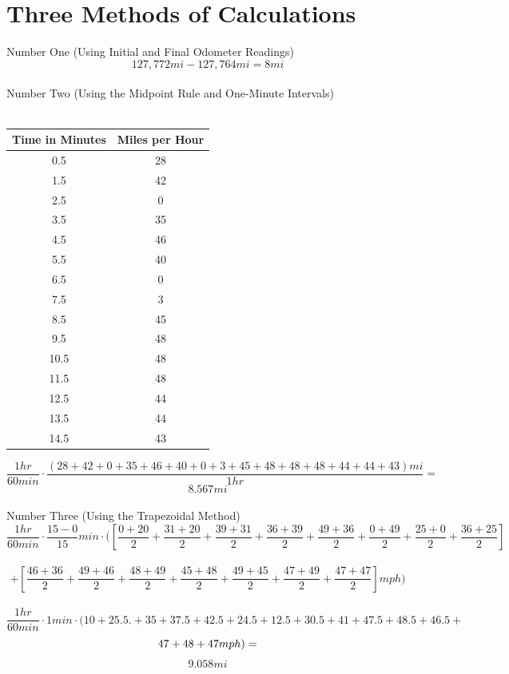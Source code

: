 \documentclass[12 pt]{article}
\begin{document}
\section{Three Methods of Calculations}
Number One (Using Initial and Final Odometer Readings)\\
$$127,772 mi-127,764 mi=8 mi$$\\
Number Two (Using the Midpoint Rule and One-Minute Intervals)\\\\
\begin{tabular}{c|c}
    Time in Minutes & Miles per Hour \\
    \hline
   0.5 & 28\\
   \hline
   1.5 & 42\\
   \hline
   2.5 & 0\\
   \hline
   3.5 & 35\\
   \hline
   4.5 & 46\\
   \hline
   5.5 & 40\\
   \hline
   6.5 & 0\\
   \hline
   7.5 & 3\\
   \hline
   8.5 & 45\\
   \hline
   9.5 & 48\\
   \hline
   10.5 & 48\\
   \hline
   11.5 & 48\\
   \hline
   12.5 & 44\\
   \hline
   13.5 & 44\\
   \hline
   14.5 & 43\\
\end{tabular}
$$\frac{1hr}{60min}\cdot\frac{(28+42+0+35+46+40+0+3+45+48+48+48+44+44+43)mi}{1hr}=$$
$$8.567mi$$\\
Number Three (Using the Trapezoidal Method)\\
$$\frac{1hr}{60min}\cdot\frac{15-0}{15}min\cdot([\frac{0+20}{2}+\frac{31+20}{2}+\frac{39+31}{2}+\frac{36+39}{2}+\frac{49+36}{2}+\frac{0+49}{2}+\frac{25+0}{2}+\frac{36+25}{2}]$$\\
$$+[\frac{46+36}{2}+\frac{49+46}{2}+\frac{48+49}{2}+\frac{45+48}{2}+\frac{49+45}{2}+\frac{47+49}{2}+\frac{47+47}{2}]mph)$$\\
$$\frac{1hr}{60min}\cdot1min\cdot(10+25.5.+35+37.5+42.5+24.5+12.5+30.5+41+47.5+48.5+46.5+$$
$$\\47+48+47mph)=$$
$$9.058 mi$$\\
\end{document}

